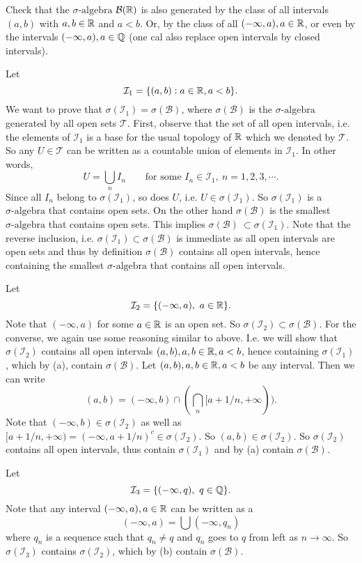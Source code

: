 \begin{problem}
	Check that the $\sigma\text{-algebra}$ $ \mathcal{B}(\mathbb{R}) $ is also generated by the class of all intervals $ (a,b) $ with $ a,b\in \mathbb{R} $ and $ a<b $. Or, by the class of all $ (-\infty, a), a\in \mathbb{R} $, or even by the intervals $ (-\infty, a), a\in \mathbb{Q} $ (one cal also replace open intervals by closed intervals).
\end{problem}
\begin{solution}
	Let 
	\[ \mathcal{I}_1 = \{(a,b): a\in \mathbb{R}, a<b\}. \]
	We want to prove that $ \sigma(\mathcal{I}_1) = \sigma(\mathcal{B}) $, where $ \sigma(\mathcal{B}) $ is the $\sigma\text{-algebra}$ generated by all open sets $ \mathcal{T} $. First, observe that the set of all open intervals, i.e. the elements of $ \mathcal{I}_1 $ is a base for the usual topology of $ \mathbb{R} $ which we denoted by $ \mathcal{T} $. So any $ U \in \mathcal{T} $ can be written as a countable union of elements in $ \mathcal{I}_1 $. In other words, 
	\[ U = \bigcup_n I_n \qquad \text{for some $I_n \in \mathcal{I}_1,\ n=1,2,3,\cdots$}. \]
	Since all $ I_n $ belong to $ \sigma(\mathcal{I}_1) $, so does $ U $, i.e. $ U \in \sigma(\mathcal{I}_1) $. So $ \sigma(\mathcal{I}_1) $ is a $\sigma\text{-algebra}$ that contains open sets. On the other hand $ \sigma(\mathcal{B}) $ is the smallest $\sigma\text{-algebra}$ that contains open sets. This implies $ \sigma(\mathcal{B})\ \subset \sigma(\mathcal{I}_1) $. Note that the reverse inclusion, i.e. $ \sigma(\mathcal{I}_1)\subset\sigma(\mathcal{B}) $ is immediate as all open intervals are open sets and thus by definition $ \sigma(\mathcal{B}) $ contains all open intervals, hence containing the smallest $\sigma\text{-algebra}$ that contains all open intervals.
	
	Let
	\[ \mathcal{I}_2 = \set{(-\infty, a),\ a\in \R}. \]
	Note that $ (-\infty, a) $ for some $ a\in \mathbb{R} $ is an open set. So $ \sigma(\mathcal{I}_2) \subset \sigma(\mathcal{B}) $. For the converse, we again use some reasoning similar to above. I.e. we will show that $ \sigma(\mathcal{I}_2) $ contains all open intervals $ (a,b), a,b\in \mathbb{R}, a<b $, hence containing $ \sigma(\mathcal{I}_1) $, which by (a), contain $ \sigma(\mathcal{B}) $. Let $ (a,b), a,b\in \mathbb{R}, a<b $ be any interval. Then we can write
	\[ (a,b) = (-\infty, b) \cap (\bigcap_n [a+1/n, +\infty)). \]
	Note that $ (-\infty,b) \in \sigma(\mathcal{I}_2) $ as well as $ [a+1/n, +\infty) = (-\infty, a+1/n)^c \in \sigma(\mathcal{I}_2) $. So $ (a,b) \in \sigma(\mathcal{I}_2) $. So $ \sigma(\mathcal{I}_2) $ contains all open intervals, thus contain $ \sigma(\mathcal{I}_1) $ and by (a) contain $ \sigma(\mathcal{B}) $.
	
	Let 
	\[ \mathcal{I}_3 = \set{(-\infty, q),\ q\in \Q}. \]
	Note that any interval $ (-\infty, a), a\in \mathbb{R} $ can be written as a
	\[ (-\infty, a) = \bigcup (-\infty, q_n) \]
	where $ q_n $ is a sequence such that $ q_n\neq q $ and $ q_n $ goes to $ q $ from left as $ n\to\infty $. So $ \sigma(\mathcal{I}_3) $ contains $ \sigma(\mathcal{I}_2) $, which by (b) contain $ \sigma(\mathcal{B}) $.
\end{solution}


